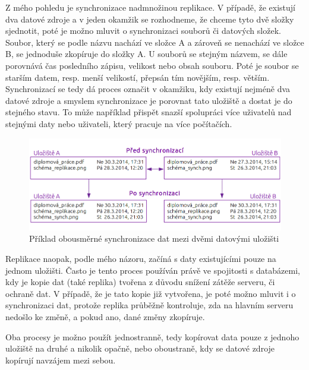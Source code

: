         Z mého pohledu je synchronizace nadmnožinou replikace. V případě, že existují
        dva datové zdroje a v jeden okamžik se rozhodneme, že chceme tyto dvě složky
        sjednotit, poté je možno mluvit o synchronizaci souborů či datových složek.
        Soubor, který se podle názvu nachází ve složce A a zároveň se nenachází ve
        složce B, se jednoduše zkopíruje do složky A. U souborů se stejným názvem, se
        dále porovnává čas posledního zápisu, velikost nebo obsah souboru. Poté je
        soubor se starším datem, resp. menší velikostí, přepsán tím novějším, resp.
        větším. Synchronizací se tedy dá proces označit v okamžiku, kdy existují
        nejméně dva datové zdroje a smyslem synchronizace je porovnat tato uložiště a
        dostat je do stejného stavu. To může například přispět snazší spolupráci více
        uživatelů nad stejnými daty nebo uživateli, který pracuje na více počítačích.
          \begin{figure}[H]
            \centering
            \includegraphics[scale=1]{../../../grafy/obr/schema_synchronizace_maxiTence.png}
            \caption {Příklad obousměrné synchronizace dat mezi dvěmi datovými uložišti}
          \end{figure}
        Replikace naopak, podle mého názoru, začíná s daty existujícími pouze na jednom
        uložišti. Často je tento proces používán právě ve spojitosti s databázemi, kdy
        je kopie dat (také replika) tvořena z důvodu snížení zátěže serveru, či ochraně
        dat. V případě, že je tato kopie již vytvořena, je poté možno mluvit i o
        synchronizaci dat, protože replika průběžně kontroluje, zda na hlavním serveru
        nedošlo ke změně, a pokud ano, dané změny zkopíruje.

        Oba procesy je možno použít jednostranně, tedy kopírovat data pouze z jednoho
        uložiště na druhé a nikolik opačně, nebo oboustraně, kdy se datové zdroje
        kopírují navzájem mezi sebou.

